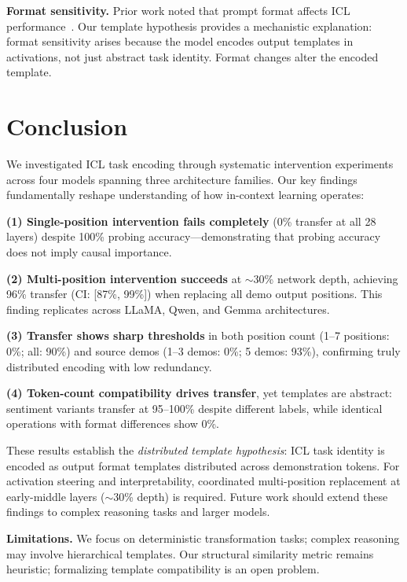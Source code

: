 \documentclass[sigconf,anonymous]{acmart}
\begin{document}
\textbf{Format sensitivity.}
Prior work noted that prompt format affects ICL performance~\cite{lu2022fantastically,zhao2021calibrate,min2022rethinking}. Our template hypothesis provides a mechanistic explanation: format sensitivity arises because the model encodes output templates in activations, not just abstract task identity. Format changes alter the encoded template.

\section{Conclusion}
\label{sec:conclusion}

We investigated ICL task encoding through systematic intervention experiments across four models spanning three architecture families. Our key findings fundamentally reshape understanding of how in-context learning operates:

\textbf{(1) Single-position intervention fails completely} (0\% transfer at all 28 layers) despite 100\% probing accuracy---demonstrating that probing accuracy does not imply causal importance.

\textbf{(2) Multi-position intervention succeeds} at $\sim$30\% network depth, achieving 96\% transfer (CI: [87\%, 99\%]) when replacing all demo output positions. This finding replicates across LLaMA, Qwen, and Gemma architectures.

\textbf{(3) Transfer shows sharp thresholds} in both position count (1--7 positions: 0\%; all: 90\%) and source demos (1--3 demos: 0\%; 5 demos: 93\%), confirming truly distributed encoding with low redundancy.

\textbf{(4) Token-count compatibility drives transfer}, yet templates are abstract: sentiment variants transfer at 95--100\% despite different labels, while identical operations with format differences show 0\%.

These results establish the \emph{distributed template hypothesis}: ICL task identity is encoded as output format templates distributed across demonstration tokens. For activation steering and interpretability, coordinated multi-position replacement at early-middle layers ($\sim$30\% depth) is required. Future work should extend these findings to complex reasoning tasks and larger models.

\textbf{Limitations.} We focus on deterministic transformation tasks; complex reasoning may involve hierarchical templates. Our structural similarity metric remains heuristic; formalizing template compatibility is an open problem.
\end{document}
